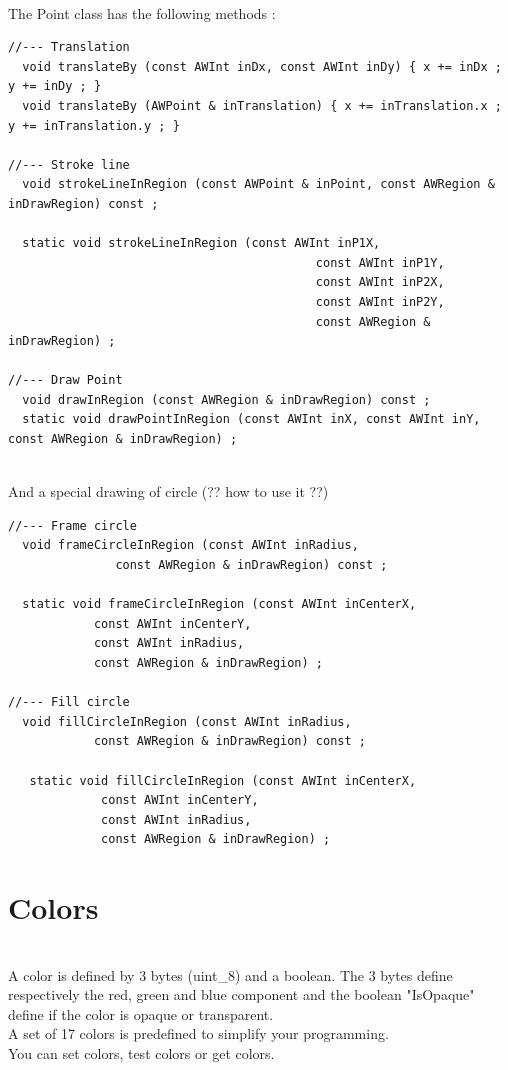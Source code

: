 \documentclass[a4paper,11pt]{extarticle}
\begin{document}
~\\ The Point class has the following methods :

\begin{lstlisting}[language=Arduinonl]
//--- Translation
  void translateBy (const AWInt inDx, const AWInt inDy) { x += inDx ; y += inDy ; }
  void translateBy (AWPoint & inTranslation) { x += inTranslation.x ; y += inTranslation.y ; }

//--- Stroke line
  void strokeLineInRegion (const AWPoint & inPoint, const AWRegion & inDrawRegion) const ;

  static void strokeLineInRegion (const AWInt inP1X,
                                           const AWInt inP1Y,
                                           const AWInt inP2X,
                                           const AWInt inP2Y,
                                           const AWRegion & inDrawRegion) ;

//--- Draw Point
  void drawInRegion (const AWRegion & inDrawRegion) const ;
  static void drawPointInRegion (const AWInt inX, const AWInt inY, const AWRegion & inDrawRegion) ;
\end{lstlisting}

~\\ And a special drawing of circle (?? how to use it ??)

\begin{lstlisting}[language=Arduinonl]
//--- Frame circle
  void frameCircleInRegion (const AWInt inRadius,
               const AWRegion & inDrawRegion) const ;

  static void frameCircleInRegion (const AWInt inCenterX,
            const AWInt inCenterY,
            const AWInt inRadius,
            const AWRegion & inDrawRegion) ;

//--- Fill circle
  void fillCircleInRegion (const AWInt inRadius,
            const AWRegion & inDrawRegion) const ;

   static void fillCircleInRegion (const AWInt inCenterX,
             const AWInt inCenterY,
             const AWInt inRadius,
             const AWRegion & inDrawRegion) ;
\end{lstlisting}

\newpage
\section{Colors}

~\\ A color is defined by 3 bytes (uint\_8) and a boolean. The 3 bytes define respectively the red, green and blue component and the boolean "IsOpaque" define if the color is opaque or transparent.
~\\ A set of 17 colors is predefined to simplify your programming.
~\\ You can set colors, test colors or get colors.
\end{document}
